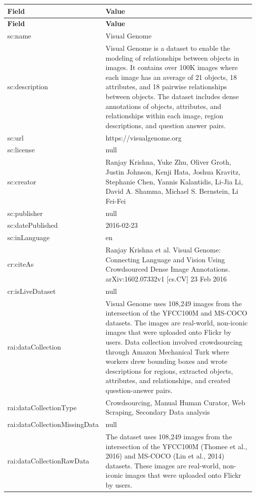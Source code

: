 \documentclass[10pt,a4paper]{article}
\begin{document}
\begin{longtable}{|p{4cm}|p{12cm}|}
\hline
\textbf{Field} & \textbf{Value} \\
\hline
\endfirsthead
\hline
\textbf{Field} & \textbf{Value} \\
\hline
\endhead
\hline
\endfoot

sc:name & Visual Genome \\
\hline
sc:description & Visual Genome is a dataset to enable the modeling of relationships between objects in images. It contains over 100K images where each image has an average of 21 objects, 18 attributes, and 18 pairwise relationships between objects. The dataset includes dense annotations of objects, attributes, and relationships within each image, region descriptions, and question answer pairs. \\
\hline
sc:url & https://visualgenome.org \\
\hline
sc:license & null \\
\hline
sc:creator & Ranjay Krishna, Yuke Zhu, Oliver Groth, Justin Johnson, Kenji Hata, Joshua Kravitz, Stephanie Chen, Yannis Kalantidis, Li-Jia Li, David A. Shamma, Michael S. Bernstein, Li Fei-Fei \\
\hline
sc:publisher & null \\
\hline
sc:datePublished & 2016-02-23 \\
\hline
sc:inLanguage & en \\
\hline
cr:citeAs & Ranjay Krishna et al. Visual Genome: Connecting Language and Vision Using Crowdsourced Dense Image Annotations. arXiv:1602.07332v1 [cs.CV] 23 Feb 2016 \\
\hline
cr:isLiveDataset & null \\
\hline
rai:dataCollection & Visual Genome uses 108,249 images from the intersection of the YFCC100M and MS-COCO datasets. The images are real-world, non-iconic images that were uploaded onto Flickr by users. Data collection involved crowdsourcing through Amazon Mechanical Turk where workers drew bounding boxes and wrote descriptions for regions, extracted objects, attributes, and relationships, and created question-answer pairs. \\
\hline
rai:dataCollectionType & Crowdsourcing, Manual Human Curator, Web Scraping, Secondary Data analysis \\
\hline
rai:dataCollectionMissingData & null \\
\hline
rai:dataCollectionRawData & The dataset uses 108,249 images from the intersection of the YFCC100M (Thomee et al., 2016) and MS-COCO (Lin et al., 2014) datasets. These images are real-world, non-iconic images that were uploaded onto Flickr by users. \\

\end{longtable}
\end{document}
